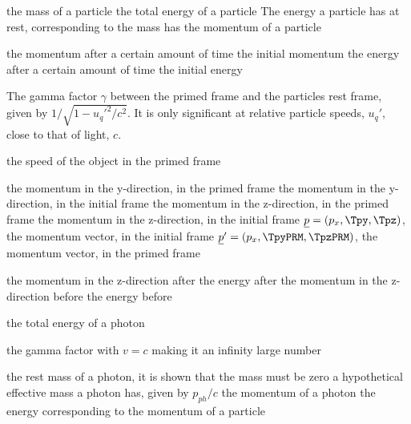 {the mass of a particle}
{the total energy of a particle}
{The energy a particle has at rest, corresponding to the mass has}
{the momentum of a particle}

{the momentum after a certain amount of time}
{the initial momentum}
{the energy after a certain amount of time}
{the initial energy}



{The gamma factor $\gamma$ between the primed frame and the particles rest frame, given by ${1/\sqrt{1-u_q'^2/c^2}}$. It is only significant at relative particle speeds, $u_q'$, close to that of light, $c$.}

{the speed of the object in the primed frame}

{the momentum in the y-direction, in the primed frame}
{the momentum in the y-direction, in the initial frame}
{the momentum in the z-direction, in the primed frame}
{the momentum in the z-direction, in the initial frame}
{$\underline{p}=(p_x,\Tpy,\Tpz)$, the momentum vector, in the initial frame}
{$\underline{p}'=(p_x,\TpyPRM,\TpzPRM)$, the momentum vector, in the primed frame}

{the momentum in the z-direction after}
{the energy after}
{the momentum in the z-direction before}
{the energy before}

{the total energy of a photon}

{the gamma factor with $v=c$ making it an infinity large number}

{the rest mass of a photon, it is shown that the mass must be zero}
{a hypothetical effective mass a photon has, given by $p_{ph}/c$ }
{the momentum of a photon}
{the energy corresponding to the momentum of a particle}



